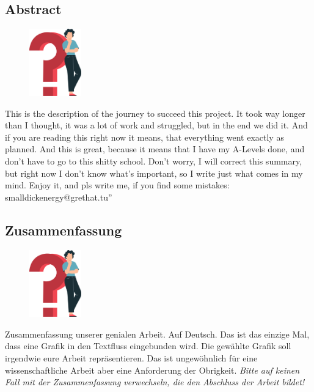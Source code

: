 \begin{spacing}{1}
    \chapter*{Abstract}
\end{spacing}
\begin{figure}
    \begin{center}
      \includegraphics[width=0.2\textwidth]{pics/question_mark.png}
    \end{center}
\end{figure}
This is the description of the journey to succeed this project.
It took way longer than I thought, it was a lot of work and struggled, 
but in the end we did it. And if you are reading this right now it means,
that everything went exactly as planned. And this is great, because it means
 that I have my A-Levels done, and don’t have to go to this shitty school. Don’t worry, I will correct this summary, but right now I don’t know what's important, so I write just what comes in my mind. Enjoy it, and pls write me, if you find some mistakes: smalldickenergy@grethat.tu” 
\newpage
\begin{spacing}{1}
    \chapter*{Zusammenfassung}
\end{spacing}
\begin{figure}
    \begin{center}
      \includegraphics[width=0.2\textwidth]{pics/question_mark.png}
    \end{center}
\end{figure}
Zusammenfassung unserer genialen Arbeit. Auf Deutsch.
Das ist das einzige Mal, dass eine Grafik in den Textfluss eingebunden wird.
Die gewählte Grafik soll irgendwie eure Arbeit repräsentieren.
Das ist ungewöhnlich für eine wissenschaftliche Arbeit aber eine Anforderung der Obrigkeit.
\emph{Bitte auf keinen Fall mit der Zusammenfassung verwechseln, die den Abschluss der Arbeit bildet!}


